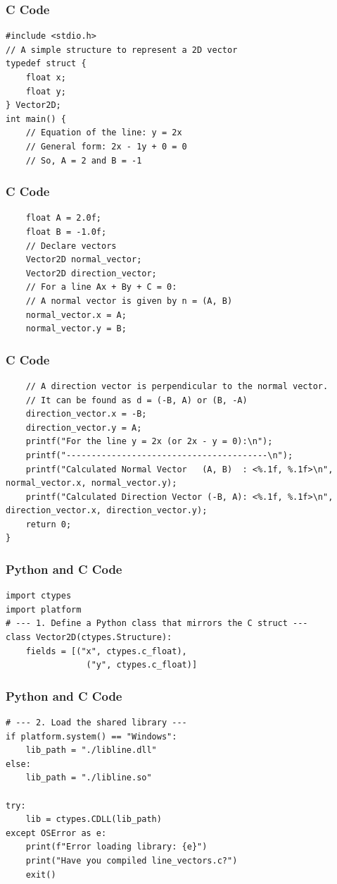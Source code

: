 \documentclass{beamer}
\begin{document}
\begin{frame}[fragile]
\frametitle{C Code}
\begin{lstlisting}
#include <stdio.h>
// A simple structure to represent a 2D vector
typedef struct {
    float x;
    float y;
} Vector2D;
int main() {
    // Equation of the line: y = 2x
    // General form: 2x - 1y + 0 = 0
    // So, A = 2 and B = -1
\end{lstlisting}
\end{frame}

\begin{frame}[fragile]
\frametitle{C Code}
\begin{lstlisting}
    float A = 2.0f;
    float B = -1.0f;
    // Declare vectors
    Vector2D normal_vector;
    Vector2D direction_vector;
    // For a line Ax + By + C = 0:
    // A normal vector is given by n = (A, B)
    normal_vector.x = A;
    normal_vector.y = B;
\end{lstlisting}
\end{frame}

\begin{frame}[fragile]
\frametitle{C Code}
\begin{lstlisting}
    // A direction vector is perpendicular to the normal vector.
    // It can be found as d = (-B, A) or (B, -A)
    direction_vector.x = -B;
    direction_vector.y = A;
    printf("For the line y = 2x (or 2x - y = 0):\n");
    printf("----------------------------------------\n");
    printf("Calculated Normal Vector   (A, B)  : <%.1f, %.1f>\n", normal_vector.x, normal_vector.y);
    printf("Calculated Direction Vector (-B, A): <%.1f, %.1f>\n", direction_vector.x, direction_vector.y);
    return 0;
}
\end{lstlisting}
\end{frame}


\begin{frame}[fragile]
\frametitle{Python and C Code}
\begin{lstlisting}
import ctypes
import platform
# --- 1. Define a Python class that mirrors the C struct ---
class Vector2D(ctypes.Structure):
    fields = [("x", ctypes.c_float),
                ("y", ctypes.c_float)]
\end{lstlisting}
\end{frame}


\begin{frame}[fragile]
\frametitle{Python and C Code}
\begin{lstlisting}
# --- 2. Load the shared library ---
if platform.system() == "Windows":
    lib_path = "./libline.dll"
else:
    lib_path = "./libline.so"

try:
    lib = ctypes.CDLL(lib_path)
except OSError as e:
    print(f"Error loading library: {e}")
    print("Have you compiled line_vectors.c?")
    exit()
\end{lstlisting}
\end{frame}
\end{document}

